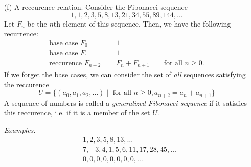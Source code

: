 \documentclass[11pt]{article}
\begin{document}
\begin{enumerate}
        \begin{proof}
            We must show that this is true.
            \begin{enumerate}
                \item[(1)] The zero sequence \(a_i = 0 \Rightarrow (0,0,0,\dots)\) converges to 0.
                \item[(2)] From Calculus, the sum of two convergent sequences converges. In fact, \[\lim_{i \to \infty} (a_i + b_i) = \lim_{i \to \infty} a_i + \lim_{i \to \infty} b_i\]
                \item[(3)] Similar proof to scalar muiltiplication. \[\lim_{i \to \infty} (ka_i) = k \lim_{i \to \infty} a_i\]   
            \end{enumerate}
        \end{proof}
        Let $U$ be the set of sequences that converge to 0. Then $U$ is a subspace of $V$ (and of $W$).

        \item[(f)] A reccurence relation. Consider the Fibonacci sequence \[1,1,2,3,5,8,13,21,34,55,89,144,\dots\] Let \(F_n\) be the \(n\)th element of this sequence. Then, we have the following recurrence:
        \begin{align*}
            \text{base case }  F_0 &= 1 \\
            \text{base case }  F_1 &= 1 \\
            \text{reccurence }  F_{n + 2} &= F_n + F_{n + 1} \qquad \text{for all } n \geq 0.
        \end{align*} 
        If we forget the base cases, we can consider the set of \emph{all} sequences satisfying the reccurence \[U = \{(a_0, a_1, a_2, \dots) \mid \text{ for all } n \geq 0, a_{n + 2} = a_n + a_{n+1}\}\] A sequence of numbers is called a \emph{generalized Fibonacci sequence} if it satisfies this reccurence, i.e. if it is a member of the set $U$.

        \emph{Examples.}
        \begin{align*}
            & 1,2,3,5,8,13, \dots \\
            & 7, -3,4,1,5,6,11,17,28,45, \dots \\
            & 0,0,0,0,0,0,0,0, \dots
        \end{align*} 


\end{enumerate}
\end{document}
